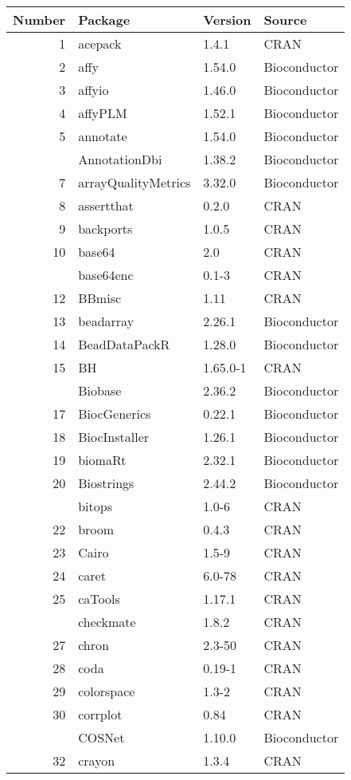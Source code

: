 
\begin{longtable}{rlll}
\toprule
Number & Package & Version & Source\\
\midrule
1 & acepack & 1.4.1 & CRAN\\
2 & affy & 1.54.0 & Bioconductor\\
3 & affyio & 1.46.0 & Bioconductor\\
4 & affyPLM & 1.52.1 & Bioconductor\\
5 & annotate & 1.54.0 & Bioconductor\\
\addlinespace
6 & AnnotationDbi & 1.38.2 & Bioconductor\\
7 & arrayQualityMetrics & 3.32.0 & Bioconductor\\
8 & assertthat & 0.2.0 & CRAN\\
9 & backports & 1.0.5 & CRAN\\
10 & base64 & 2.0 & CRAN\\
\addlinespace
11 & base64enc & 0.1-3 & CRAN\\
12 & BBmisc & 1.11 & CRAN\\
13 & beadarray & 2.26.1 & Bioconductor\\
14 & BeadDataPackR & 1.28.0 & Bioconductor\\
15 & BH & 1.65.0-1 & CRAN\\
\addlinespace
16 & Biobase & 2.36.2 & Bioconductor\\
17 & BiocGenerics & 0.22.1 & Bioconductor\\
18 & BiocInstaller & 1.26.1 & Bioconductor\\
19 & biomaRt & 2.32.1 & Bioconductor\\
20 & Biostrings & 2.44.2 & Bioconductor\\
\addlinespace
21 & bitops & 1.0-6 & CRAN\\
22 & broom & 0.4.3 & CRAN\\
23 & Cairo & 1.5-9 & CRAN\\
24 & caret & 6.0-78 & CRAN\\
25 & caTools & 1.17.1 & CRAN\\
\addlinespace
26 & checkmate & 1.8.2 & CRAN\\
27 & chron & 2.3-50 & CRAN\\
28 & coda & 0.19-1 & CRAN\\
29 & colorspace & 1.3-2 & CRAN\\
30 & corrplot & 0.84 & CRAN\\
\addlinespace
31 & COSNet & 1.10.0 & Bioconductor\\
32 & crayon & 1.3.4 & CRAN\\

\end{longtable}

